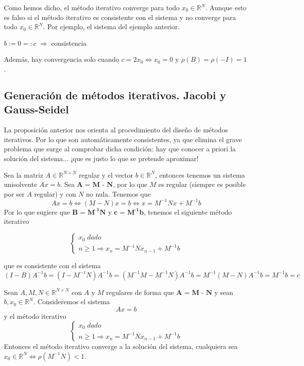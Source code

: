 \begin{nota}
Como hemos dicho, el método iterativo converge para todo $x_0 \in \mathbb{R}^N$. Aunque esto es falso si el método iterativo es consistente con el sistema y no converge para todo $x_0 \in \mathbb{R}^N$. Por ejemplo, el sistema del ejemplo anterior.

$b := 0 =: c$ $\Rightarrow$ consistencia

Además, hay convergencia solo cuando $c = 2x_0 \Leftrightarrow x_0 = 0$ y $\rho (B) = \rho (-I) = 1$.
\end{nota}

\subsection{Generación de métodos iterativos. Jacobi y Gauss-Seidel}
La proposición anterior nos orienta al procedimiento del diseño de métodos iterativos. Por lo que son automáticamente consistentes, ya que elimina el grave problema que surge al comprobar dicha condición: hay que conocer a priori la solución del sistema... ¡que es justo lo que se pretende aproximar!

Sea la matriz $A \in \mathbb{R}^{N \times N}$ regular y el vector $b \in \mathbb{R}^N$, entonces tenemos un sistema unisolvente $Ax = b$. Sea $\textbf{A =  M - N}$, por lo que $M$ es regular (siempre es posible por ser $A$ regular) y  con $N$ no nula. Tenemos que
\[ Ax = b \Leftrightarrow (M-N)x = b \Leftrightarrow x = M^{-1}Nx + M^{-1}b \]
Por lo que sugiere que $\textbf{B = M} ^{ \textbf{-1} } \textbf{N}$ y $\textbf{c = M} ^{\textbf{-1} } \textbf{b}$, tenemos el siguiente método iterativo

\[ \left\{ \begin{array}{c}
x_0 \; dado \\
n \geq 1 \Rightarrow x_n = M^{-1}Nx_{n-1} + M^{-1}b
\end{array}
\right. \]

que es consistente con el sistema
\[ (I-B)A^{-1}b = (I-M^{-1}N)A^{-1}b = (M^{-1}M-M^{-1}N)A^{-1}b = M^{-1}(M-N)A^{-1}b = M^{-1}b = c \]

\begin{ncor}
Sean $A, M, N \in \mathbb{R}^{N \times N}$ con $A$ y $M$ regulares de forma que $\textbf{A = M - N}$ y sean $b, x_0 \in \mathbb{R}^N$. Consideremos el sistema $$Ax = b$$ y el método iterativo
\[ \left\{ \begin{array}{c}
x_0 \; dado \\
n \geq 1 \Rightarrow x_n = M^{-1}Nx_{n-1} + M^{-1}b
\end{array}
\right. \]
Entonces el método iterativo converge a la solución del sistema, cualquiera sea $x_0 \in \mathbb{R}^N \Leftrightarrow \rho (M^{-1}N) < 1$.
\end{ncor}

